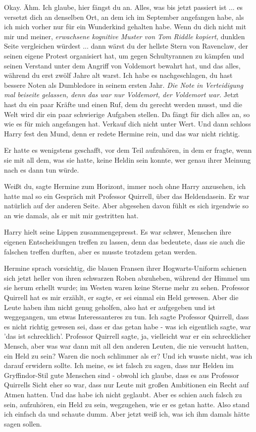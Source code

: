 \glqq{}Okay. Ähm. Ich glaube, hier fängst du an. Alles, was bis jetzt passiert
ist ... es versetzt dich an denselben Ort, an dem ich im September angefangen
habe, als ich mich vorher nur für ein Wunderkind gehalten habe. Wenn du dich
nicht mit mir und meiner\grqq{},\emph{ erwachsene kognitive Muster von Tom
Riddle kopiert,} \glqq{}dunklen Seite vergleichen würdest ... dann wärst du der
hellste Stern von Ravenclaw, der seinen eigene Protest organisiert hat, um gegen
Schultyrannen zu kämpfen und seinen Verstand unter dem Angriff von Voldemort
bewahrt hat, und das alles, während du erst zwölf Jahre alt warst. Ich habe es
nachgeschlagen, du hast bessere Noten als Dumbledore in seinem ersten
Jahr.\grqq{} \emph{Die Note in Verteidigung mal beiseite gelassen, denn das war
nur Voldemort, der Voldemort war.} \glqq{}Jetzt hast du ein paar Kräfte und einen
Ruf, dem du gerecht werden musst, und die Welt wird dir ein paar schwierige
Aufgaben stellen. Da fängt für dich alles an, so wie es für mich angefangen hat.
Verkauf dich nicht unter Wert.\grqq{} Und dann schloss Harry fest den Mund, denn
er redete Hermine rein, und das war nicht richtig.

Er hatte es wenigstens geschafft, vor dem Teil aufzuhören, in dem er fragte,
wenn sie mit all dem, was sie hatte, keine Heldin sein konnte, wer genau ihrer
Meinung nach es dann tun würde.

\glqq{}Weißt du\grqq{}, sagte Hermine zum Horizont, immer noch ohne Harry
anzusehen, \glqq{}ich hatte mal so ein Gespräch mit Professor Quirrell, über das
Heldendasein. Er war natürlich auf der anderen Seite. Aber abgesehen davon fühlt
es sich irgendwie so an wie damals, als er mit mir gestritten hat.\grqq{}

Harry hielt seine Lippen zusammengepresst. Es war schwer, Menschen ihre eigenen
Entscheidungen treffen zu lassen, denn das bedeutete, dass sie auch die falschen
treffen durften, aber es musste trotzdem getan werden.

Hermine sprach vorsichtig, die blauen Fransen ihrer Hogwarts-Uniform schienen
sich jetzt heller von ihren schwarzen Roben abzuheben, während der Himmel um sie
herum erhellt wurde; im Westen waren keine Sterne mehr zu sehen. \glqq{}Professor
Quirrell hat es mir erzählt, er sagte, er sei einmal ein Held gewesen. Aber die
Leute haben ihm nicht genug geholfen, also hat er aufgegeben und ist
weggegangen, um etwas Interessanteres zu tun. Ich sagte Professor Quirrell, dass
es nicht richtig gewesen sei, dass er das getan habe - was ich eigentlich sagte,
war 'das ist schrecklich'. Professor Quirrell sagte, ja, vielleicht war er ein
schrecklicher Mensch, aber was war dann mit all den anderen Leuten, die nie
versucht hatten, ein Held zu sein? Waren die noch schlimmer als er? Und ich
wusste nicht, was ich darauf erwidern sollte. Ich meine, es ist falsch zu sagen,
dass nur Helden im Gryffindor-Stil gute Menschen sind - obwohl ich glaube, dass
es aus Professor Quirrells Sicht eher so war, dass nur Leute mit großen
Ambitionen ein Recht auf Atmen hatten. Und das habe ich nicht geglaubt. Aber es
schien auch falsch zu sein, aufzuhören, ein Held zu sein, wegzugehen, wie er es
getan hatte. Also stand ich einfach da und schaute dumm. Aber jetzt weiß ich,
was ich ihm damals hätte sagen sollen.\grqq{}

